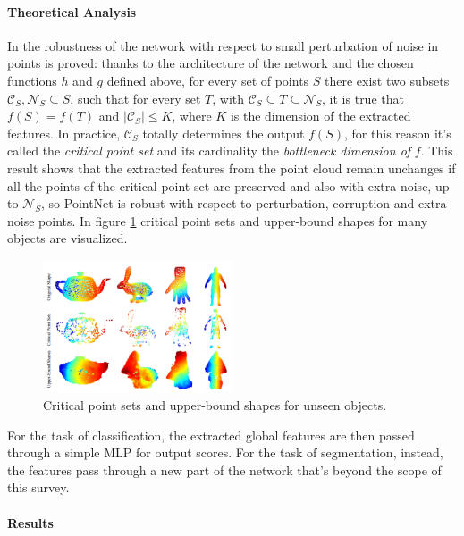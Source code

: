 \paragraph{Theoretical Analysis}

In \cite{qi2017pointnet} the robustness of the network with respect to small perturbation of noise in points is proved: thanks to the architecture of the network and the chosen functions $h$ and $g$ defined above, for every set of points $S$ there exist two subsets $\mathcal{C}_S, \mathcal{N}_S \subseteq S$, such that for every set $T$, with $\mathcal{C}_S \subseteq T \subseteq \mathcal{N}_S$, it is true that $f(S) = f(T)$ and $|\mathcal{C}_S| \le K$, where $K$ is the dimension of the extracted features. In practice, $\mathcal{C}_S$ totally determines the output $f(S)$, for this reason it's called the \textit{critical point set} and its cardinality the \textit{bottleneck dimension of} $f$. This result shows that the extracted features from the point cloud remain unchanges if all the points of the critical point set are preserved and also with extra noise, up to $\mathcal{N}_S$, so PointNet is robust with respect to perturbation, corruption and extra noise points. In figure \ref{fig:critical_point_sets} critical point sets and upper-bound shapes for many objects are visualized.

\begin{figure}[ht]
    \centering
    \includegraphics[width=0.5\textwidth]{images/critical_point_sets.png}
    \caption{Critical point sets and upper-bound shapes for unseen objects.}
    \label{fig:critical_point_sets}
\end{figure}

For the task of classification, the extracted global features are then passed through a simple MLP for output scores. For the task of segmentation, instead, the features pass through a new part of the network that's beyond the scope of this survey.

\paragraph{Results}

